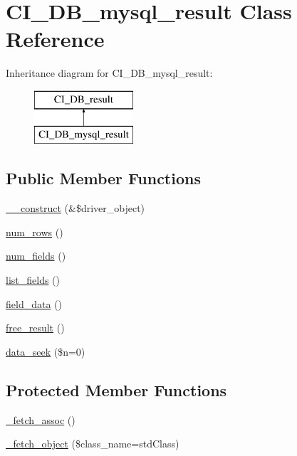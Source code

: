 \hypertarget{class_c_i___d_b__mysql__result}{}\section{C\+I\+\_\+\+D\+B\+\_\+mysql\+\_\+result Class Reference}
\label{class_c_i___d_b__mysql__result}
Inheritance diagram for C\+I\+\_\+\+D\+B\+\_\+mysql\+\_\+result\+:\begin{figure}[H]
\begin{center}
\leavevmode
\includegraphics[height=2.000000cm]{class_c_i___d_b__mysql__result}
\end{center}
\end{figure}
\subsection*{Public Member Functions}
\begin{DoxyCompactItemize}
\item 
\mbox{\hyperlink{class_c_i___d_b__mysql__result_a8e093c8b6e5733bc3f306385ee426ab7}{\+\_\+\+\_\+construct}} (\&\$driver\+\_\+object)
\item 
\mbox{\hyperlink{class_c_i___d_b__mysql__result_a218657c303ee499b97710ab0cd2f5d6e}{num\+\_\+rows}} ()
\item 
\mbox{\hyperlink{class_c_i___d_b__mysql__result_af831bf363e4d7d661a717a4932af449d}{num\+\_\+fields}} ()
\item 
\mbox{\hyperlink{class_c_i___d_b__mysql__result_a50b54eb4ea7cfd039740f532988ea776}{list\+\_\+fields}} ()
\item 
\mbox{\hyperlink{class_c_i___d_b__mysql__result_a84bffd65e53902ade1591716749a33e3}{field\+\_\+data}} ()
\item 
\mbox{\hyperlink{class_c_i___d_b__mysql__result_aad2d98d6beb3d6095405356c6107b473}{free\+\_\+result}} ()
\item 
\mbox{\hyperlink{class_c_i___d_b__mysql__result_a8255ae91816e4206e29eb7581c5af0f1}{data\+\_\+seek}} (\$n=0)
\end{DoxyCompactItemize}
\subsection*{Protected Member Functions}
\begin{DoxyCompactItemize}
\item 
\mbox{\hyperlink{class_c_i___d_b__mysql__result_a43a9a92817f1334a1c10752ec44275a0}{\+\_\+fetch\+\_\+assoc}} ()
\item 
\mbox{\hyperlink{class_c_i___d_b__mysql__result_a60806be6a9c2488820813c2a7f4fef71}{\+\_\+fetch\+\_\+object}} (\$class\+\_\+name=\textquotesingle{}std\+Class\textquotesingle{})
\end{DoxyCompactItemize}
